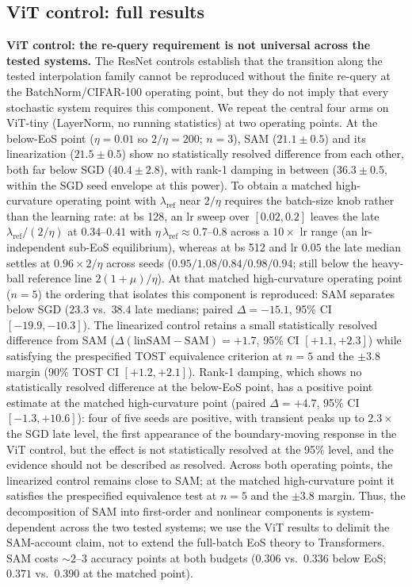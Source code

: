 \documentclass{article}
\theoremstyle{plain}
\theoremstyle{definition}
\theoremstyle{remark}
\newcommand{\lref}{\ensuremath{\lambda_{\mathrm{ref}}}}
\begin{document}
\subsection{ViT control: full results}
\textbf{ViT control: the re-query requirement is not universal across the
tested systems.} The ResNet controls establish that the transition
along the tested
interpolation family cannot be reproduced without the finite re-query
at the BatchNorm/CIFAR-100 operating point, but they do
not imply that every stochastic system requires this component. We
repeat the central four arms on ViT-tiny (LayerNorm, no running
statistics) at two operating points. At the below-EoS point
($\eta{=}0.01$ so $2/\eta{=}200$; $n{=}3$), SAM ($21.1{\pm}0.5$) and its
linearization ($21.5{\pm}0.5$) show no statistically resolved difference
from each other,
both far below SGD ($40.4{\pm}2.8$), with rank-1 damping in between
($36.3{\pm}0.5$, within the SGD seed envelope at this power). To obtain
a matched high-curvature operating point with $\lref$ near $2/\eta$
requires the batch-size knob rather
than the learning rate: at bs 128, an lr sweep over $[0.02,0.2]$ leaves
the late $\lref/(2/\eta)$ at $0.34$--$0.41$ with
$\eta\,\lref\approx0.7$--$0.8$ across a $10\times$ lr range (an
lr-independent sub-EoS equilibrium), whereas at bs 512 and lr $0.05$
the late median settles at $0.96\times 2/\eta$ across seeds
($0.95/1.08/0.84/0.98/0.94$; still below the heavy-ball
reference line $2(1{+}\mu)/\eta$). At that matched high-curvature operating point
($n{=}5$) the ordering that isolates
this component is reproduced: SAM separates below SGD ($23.3$ vs.\
$38.4$ late medians; paired $\Delta{=}{-}15.1$, 95\% CI
$[{-}19.9,{-}10.3]$). The linearized control retains a small
statistically resolved difference from SAM
($\Delta(\mathrm{linSAM}-\mathrm{SAM}){=}{+}1.7$, 95\% CI
$[{+}1.1,{+}2.3]$) while satisfying the prespecified TOST equivalence
criterion at $n{=}5$ and the $\pm3.8$ margin (90\% TOST CI
$[{+}1.2,{+}2.1]$). Rank-1 damping, which shows no statistically
resolved difference at the below-EoS point, has a positive point
estimate at the matched high-curvature point (paired
$\Delta{=}{+}4.7$, 95\% CI $[{-}1.3,{+}10.6]$): four of five seeds
are positive, with transient peaks up to $2.3\times$ the SGD late
level, the first appearance of the boundary-moving response in the
ViT control, but the effect is not statistically resolved at the
95\% level, and the evidence should not be described as resolved.
Across both operating
points, the linearized control remains close to SAM; at the matched
high-curvature point it satisfies the prespecified equivalence test at
$n{=}5$ and the $\pm3.8$ margin. Thus, the
decomposition of SAM into first-order and nonlinear components is
system-dependent across the two
tested systems; we use
the ViT results to delimit the SAM-account claim, not to extend the
full-batch EoS theory to Transformers. SAM costs ${\sim}2$--$3$ accuracy
points at both budgets ($0.306$ vs.\ $0.336$ below EoS; $0.371$ vs.\
$0.390$ at the matched point).
\end{document}

